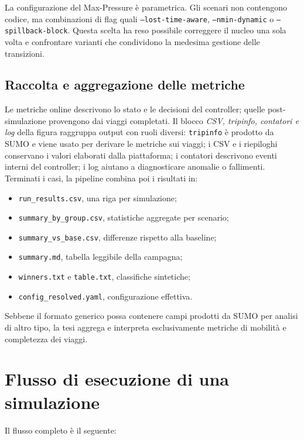 \documentclass[12pt,a4paper,oneside]{report}
\numberwithin{equation}{chapter}
\begin{document}
La configurazione del Max-Pressure è parametrica. Gli scenari non contengono
codice, ma combinazioni di flag quali \texttt{--lost-time-aware},
\texttt{--nmin-dynamic} o \texttt{--spillback-block}. Questa scelta ha reso
possibile correggere il nucleo una sola volta e confrontare varianti che
condividono la medesima gestione delle transizioni.

\subsection{Raccolta e aggregazione delle metriche}

Le metriche online descrivono lo stato e le decisioni del controller; quelle
post-simulazione provengono dai viaggi completati. Il blocco
\emph{CSV, tripinfo, contatori e log} della figura raggruppa output con ruoli
diversi: \texttt{tripinfo} è prodotto da SUMO e viene usato per derivare le
metriche sui viaggi; i CSV e i riepiloghi conservano i valori elaborati dalla
piattaforma; i contatori descrivono eventi interni del controller; i log aiutano
a diagnosticare anomalie o fallimenti. Terminati i casi, la pipeline combina
poi i risultati in:

\begin{itemize}
    \item \texttt{run\_results.csv}, una riga per simulazione;
    \item \texttt{summary\_by\_group.csv}, statistiche aggregate per scenario;
    \item \texttt{summary\_vs\_base.csv}, differenze rispetto alla baseline;
    \item \texttt{summary.md}, tabella leggibile della campagna;
    \item \texttt{winners.txt} e \texttt{table.txt}, classifiche sintetiche;
    \item \texttt{config\_resolved.yaml}, configurazione effettiva.
\end{itemize}

Sebbene il formato generico possa contenere campi prodotti da SUMO per analisi
di altro tipo, la tesi aggrega e interpreta esclusivamente metriche di mobilità
e completezza dei viaggi.

\section{Flusso di esecuzione di una simulazione}

Il flusso completo è il seguente:
\end{document}
